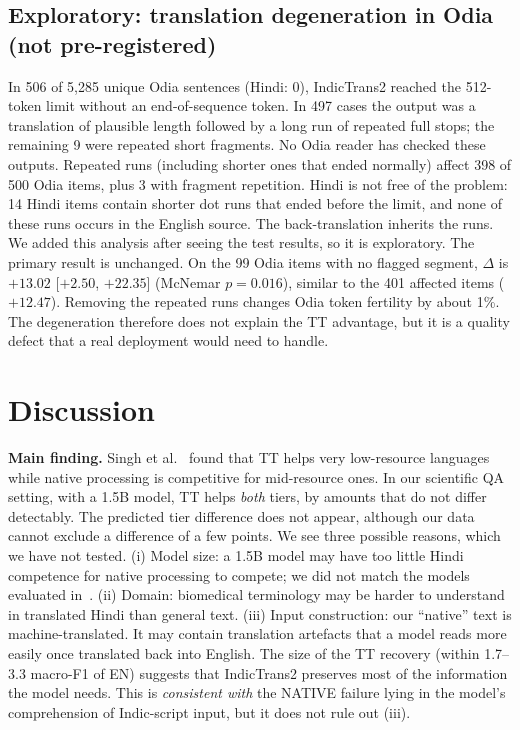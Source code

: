\documentclass[acmsmall,nonacm]{acmart}
\begin{document}
\subsection{Exploratory: translation degeneration in Odia (not pre-registered)}
In 506 of 5,285 unique Odia sentences (Hindi: 0), IndicTrans2 reached the 512-token limit without an end-of-sequence token. In 497 cases the output was a translation of plausible length followed by a long run of repeated full stops; the remaining 9 were repeated short fragments. No Odia reader has checked these outputs. Repeated runs (including shorter ones that ended normally) affect 398 of 500 Odia items, plus 3 with fragment repetition. Hindi is not free of the problem: 14 Hindi items contain shorter dot runs that ended before the limit, and none of these runs occurs in the English source. The back-translation inherits the runs. We added this analysis after seeing the test results, so it is exploratory. The primary result is unchanged. On the 99 Odia items with no flagged segment, $\Delta$ is $+13.02$ [$+2.50$, $+22.35$] (McNemar $p = 0.016$), similar to the 401 affected items ($+12.47$). Removing the repeated runs changes Odia token fertility by about 1\%. The degeneration therefore does not explain the TT advantage, but it is a quality defect that a real deployment would need to handle.

\section{Discussion}

\textbf{Main finding.} Singh et al.~\cite{singh2025indicqa} found that TT helps very low-resource languages while native processing is competitive for mid-resource ones. In our scientific QA setting, with a 1.5B model, TT helps \emph{both} tiers, by amounts that do not differ detectably. The predicted tier difference does not appear, although our data cannot exclude a difference of a few points. We see three possible reasons, which we have not tested. (i) Model size: a 1.5B model may have too little Hindi competence for native processing to compete; we did not match the models evaluated in~\cite{singh2025indicqa}. (ii) Domain: biomedical terminology may be harder to understand in translated Hindi than general text. (iii) Input construction: our ``native'' text is machine-translated. It may contain translation artefacts that a model reads more easily once translated back into English. The size of the TT recovery (within 1.7--3.3 macro-F1 of EN) suggests that IndicTrans2 preserves most of the information the model needs. This is \emph{consistent with} the NATIVE failure lying in the model's comprehension of Indic-script input, but it does not rule out (iii).
\end{document}
